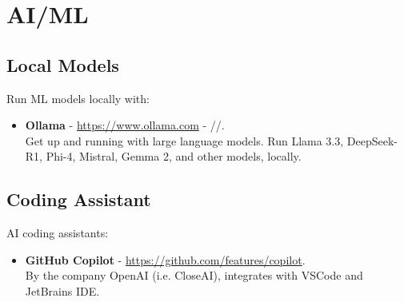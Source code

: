 \section{AI/ML}
\subsection{Local Models}
Run ML models locally with:
\begin{itemize}
    \item \textbf{Ollama} - \url{https://www.ollama.com} - \faLinux/\faApple/\faWindows.\\
    Get up and running with large language models. Run Llama 3.3, DeepSeek-R1, Phi-4, Mistral, Gemma 2, and other models, locally.

\end{itemize}

\subsection{Coding Assistant}
AI coding assistants:
\begin{itemize}
    \item \textbf{GitHub Copilot} - \url{https://github.com/features/copilot}.\\
    By the company OpenAI (i.e. CloseAI), integrates with VSCode and JetBrains IDE.
\end{itemize}
